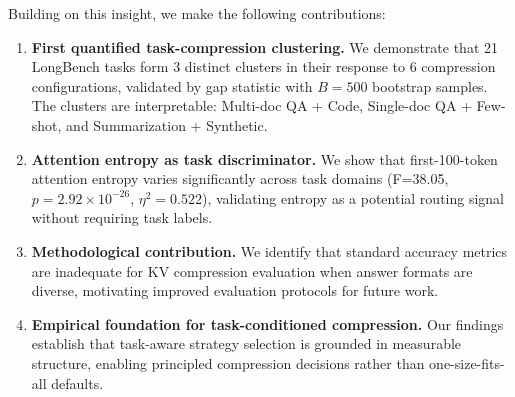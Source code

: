 Building on this insight, we make the following contributions:

\begin{enumerate}
    \item \textbf{First quantified task-compression clustering.} We demonstrate that 21 LongBench tasks form 3 distinct clusters in their response to 6 compression configurations, validated by gap statistic with $B=500$ bootstrap samples. The clusters are interpretable: Multi-doc QA + Code, Single-doc QA + Few-shot, and Summarization + Synthetic.

    \item \textbf{Attention entropy as task discriminator.} We show that first-100-token attention entropy varies significantly across task domains (F=38.05, $p=2.92 \times 10^{-26}$, $\eta^2=0.522$), validating entropy as a potential routing signal without requiring task labels.

    \item \textbf{Methodological contribution.} We identify that standard accuracy metrics are inadequate for KV compression evaluation when answer formats are diverse, motivating improved evaluation protocols for future work.

    \item \textbf{Empirical foundation for task-conditioned compression.} Our findings establish that task-aware strategy selection is grounded in measurable structure, enabling principled compression decisions rather than one-size-fits-all defaults.
\end{enumerate}
